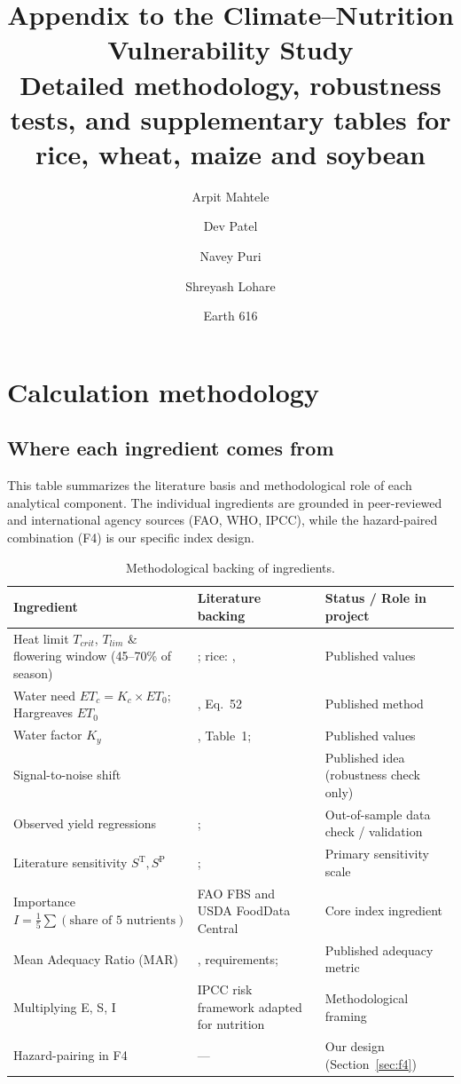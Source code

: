 \documentclass[11pt,a4paper]{article}
\title{\textbf{Appendix to the Climate--Nutrition Vulnerability Study}\\[0.3em]
\large Detailed methodology, robustness tests, and supplementary tables for rice, wheat, maize and soybean}
\author{Arpit Mahtele \and Dev Patel \and Navey Puri \and Shreyash Lohare}
\date{Earth 616}
\let\textcite\citet
\newcommand{\TT}{\mathrm{T}}   %
\newcommand{\PP}{\mathrm{P}}   %
\begin{document}
\maketitle
\tableofcontents
\newpage

\section{Calculation methodology}\label{sec:calc}
\subsection{Where each ingredient comes from}
This table summarizes the literature basis and methodological role of each analytical component. The individual ingredients are grounded in peer-reviewed and international agency sources (FAO, WHO, IPCC), while the hazard-paired combination (F4) is our specific index design.

\begin{table}[H]\centering\footnotesize
\begin{tabular}{p{4.2cm}p{5.6cm}p{4.6cm}}
\toprule
Ingredient & Literature backing & Status / Role in project\\
\midrule
Heat limit $T_{crit}$, $T_{lim}$ \& flowering window (45--70\% of season) & \textcite{deryng2014}; rice: \textcite{yoshida1981}, \textcite{jagadish2007} & Published values\\
Water need $ET_c = K_c \times ET_0$; Hargreaves $ET_0$ & \textcite{fao56}, Eq.~52 & Published method\\
Water factor $K_y$ & \textcite{fao66}, Table~1; \textcite{brouwer1986} & Published values\\
Signal-to-noise shift & \textcite{hawkins2012} & Published idea (robustness check only)\\
Observed yield regressions & \textcite{lobell2007}; \textcite{ray2015} & Out-of-sample data check / validation\\
Literature sensitivity $S^{\TT}, S^{\PP}$ & \textcite{deryng2014}; \textcite{fao66} & Primary sensitivity scale\\
Importance $I = \tfrac15\sum(\text{share of 5 nutrients})$ & FAO FBS and USDA FoodData Central & Core index ingredient\\
Mean Adequacy Ratio (MAR) & \textcite{who2003}, \textcite{whofao2004} requirements; \textcite{torheim2004} & Published adequacy metric\\
Multiplying E, S, I & IPCC risk framework adapted for nutrition & Methodological framing\\
Hazard-pairing in F4 & --- & Our design (Section~\ref{sec:f4})\\
\bottomrule
\end{tabular}
\caption{Methodological backing of ingredients.}\label{tab:ingredients}
\end{table}
\end{document}

